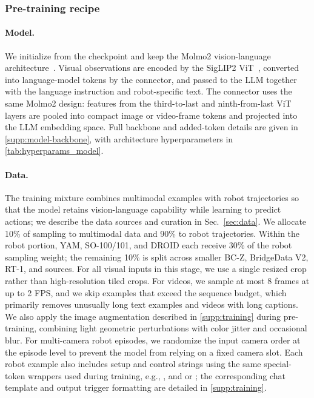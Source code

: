 \subsubsection{Pre-training recipe}
\label{sec:pretraining-recipe}

\paragraph{Model.}
We initialize from the \molmoer checkpoint and keep the Molmo2 vision-language architecture~\citep{clark2026molmo2openweightsdata}. Visual observations are encoded by the SigLIP2 ViT~\citep{tschannen2025siglip}, converted into language-model tokens by the connector, and passed to the LLM together with the language instruction and robot-specific text. The connector uses the same Molmo2 design: features from the third-to-last and ninth-from-last ViT layers are pooled into compact image or video-frame tokens and projected into the LLM embedding space. Full backbone and added-token details are given in \autoref{supp:model-backbone}, with architecture hyperparameters in \autoref{tab:hyperparams_model}.

\paragraph{Data.}
The training mixture combines multimodal examples with robot trajectories so that the model retains vision-language capability while learning to predict actions; we describe the data sources and curation in Sec.~\ref{sec:data}. We allocate 10\% of sampling to multimodal data and 90\% to robot trajectories. Within the robot portion, YAM, SO-100/101, and DROID each receive 30\% of the robot sampling weight; the remaining 10\% is split across smaller BC-Z, BridgeData V2, RT-1, and \molmoactdata sources. For all visual inputs in this stage, we use a single resized crop rather than high-resolution tiled crops. For videos, we sample at most 8 frames at up to 2 FPS, and we skip examples that exceed the sequence budget, which primarily removes unusually long text examples and videos with long captions. We also apply the image augmentation described in \autoref{supp:training} during pre-training, combining light geometric perturbations with color jitter and occasional blur. For multi-camera robot episodes, we randomize the input camera order at the episode level to prevent the model from relying on a fixed camera slot. Each robot example also includes setup and control strings using the same special-token wrappers used during training, e.g., \texttt{}, and \texttt{} or \texttt{}; the corresponding chat template and output trigger formatting are detailed in \autoref{supp:training}.


